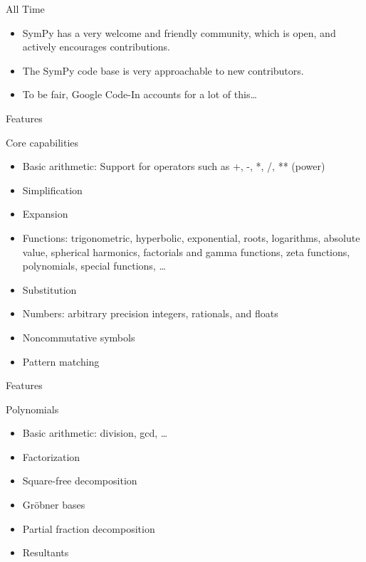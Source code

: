 \documentclass[xcolor=svgnames]{beamer}
\begin{document}
\begin{frame}
\begin{block}{All Time}
\begin{itemize}
\item SymPy has a very welcome and friendly community, which is open, and
  actively encourages contributions.
\item The SymPy code base is very approachable to new contributors.
\item To be fair, Google Code-In accounts for a lot of this\ldots
\end{itemize}
\end{block}
\end{frame}

\begin{frame}{Features}
  \begin{block}{Core capabilities}
    \begin{itemize}
    \item Basic arithmetic: Support for operators such as +, -, *, /, ** (power)
    \item Simplification
    \item Expansion
    \item Functions: trigonometric, hyperbolic, exponential, roots, logarithms,
      absolute value, spherical harmonics, factorials and gamma functions, zeta
      functions, polynomials, special functions, \ldots
    \item Substitution
    \item Numbers: arbitrary precision integers, rationals, and floats
    \item Noncommutative symbols
    \item Pattern matching
    \end{itemize}
  \end{block}
\end{frame}

\begin{frame}{Features}
  \begin{block}{Polynomials}
    \begin{itemize}
    \item Basic arithmetic: division, gcd, \ldots
    \item Factorization
    \item Square-free decomposition
    \item Gröbner bases
    \item Partial fraction decomposition
    \item Resultants
    \end{itemize}
  \end{block}
\end{frame}
\end{document}
